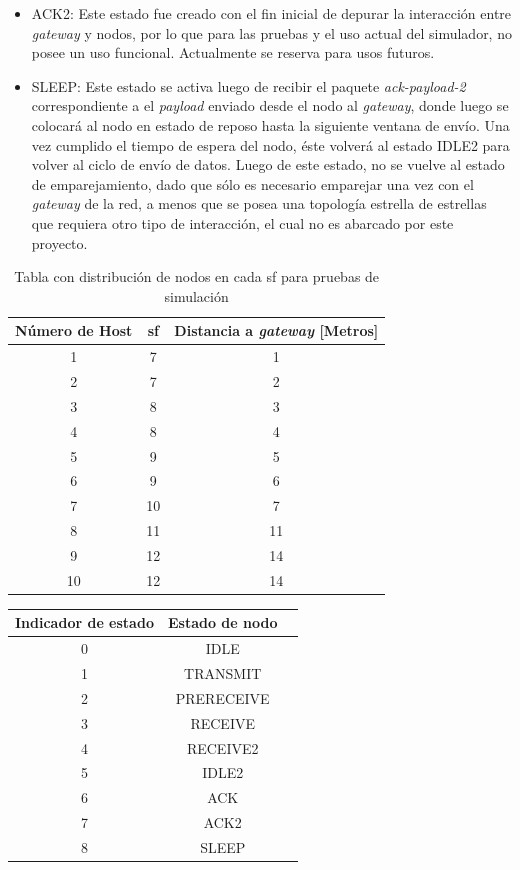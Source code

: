 \begin{justify}
\begin{itemize}
\item ACK2: Este estado fue creado con el fin inicial de depurar la interacción entre \textit{gateway} y nodos, por lo que para las pruebas y el uso actual del simulador, no posee un uso funcional. Actualmente se reserva para usos futuros.
\item SLEEP: Este estado se activa luego de recibir el paquete \textit{ack-payload-2} correspondiente a el \textit{payload} enviado desde el nodo al \textit{gateway}, donde luego se colocará al nodo en estado de reposo hasta la siguiente ventana de envío. Una vez cumplido el tiempo de espera del nodo, éste volverá al estado IDLE2 para volver al ciclo de envío de datos. Luego de este estado, no se vuelve al estado de emparejamiento, dado que sólo es necesario emparejar una vez con el \textit{gateway} de la red, a menos que se posea una topología estrella de estrellas que requiera otro tipo de interacción, el cual no es abarcado por este proyecto.
\end{itemize}

\begin{table}[!ht]
\centering
\begin{tabular}{|c|c|c|}
\hline
Número de Host & \gls{sf} & Distancia a \textit{gateway} [Metros]\\ 
\hline
1 & 7 & 1 \\
\hline
2 & 7 & 2 \\
\hline
3 & 8 & 3 \\
\hline
4 & 8 & 4 \\
\hline
5 & 9 & 5 \\
\hline
6 & 9 & 6 \\
\hline
7 & 10 & 7 \\
\hline
8 & 11 & 11 \\
\hline
9 & 12 & 14 \\
\hline
10 & 12 & 14 \\
\hline
\end{tabular}
\caption{Tabla con distribución de nodos en cada \gls{sf} para pruebas de simulación}
\label{tab:prueba}
\end{table}

\begin{table}[!ht]
\centering
\begin{tabular}{|c|c|c|}
\hline
Indicador de estado & Estado de nodo\\ 
\hline
0& IDLE \\
\hline
1& TRANSMIT \\
\hline
2& PRERECEIVE\\
\hline
3& RECEIVE\\
\hline
4& RECEIVE2\\
\hline
5& IDLE2\\
\hline
6& ACK\\
\hline
7& ACK2\\
\hline
8& SLEEP\\
\hline


\end{tabular}
\end{table}
\end{justify}
